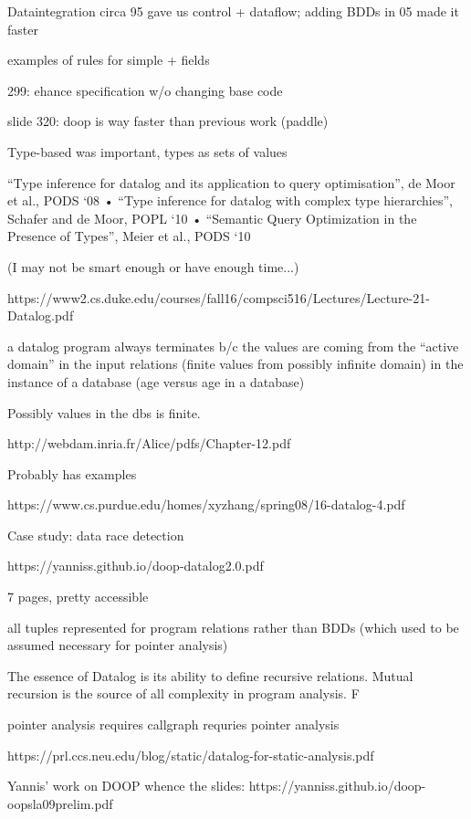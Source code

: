 \documentclass[11pt]{article}
\begin{document}
Dataintegration circa 95 gave us control + dataflow; adding BDDs in 05 made it
faster

examples of rules for simple + fields

299: ehance specification w/o changing base code

slide 320: doop is way faster than previous work (paddle)

Type-based was important, types as sets of values

“Type inference for datalog and its application to
query optimisation”, de Moor et al., PODS ‘08
• “Type inference for datalog with complex type
hierarchies”, Schafer and de Moor, POPL ‘10
• “Semantic Query Optimization in the Presence of
Types”, Meier et al., PODS ‘10

(I may not be smart enough or have enough time...)


https://www2.cs.duke.edu/courses/fall16/compsci516/Lectures/Lecture-21-Datalog.pdf

a datalog program always terminates b/c the values are coming from the ``active
domain'' in the input relations (finite values from possibly infinite domain) in
the instance of a database (age versus age in a database)

Possibly values in the dbs is finite. 


http://webdam.inria.fr/Alice/pdfs/Chapter-12.pdf

Probably has examples


https://www.cs.purdue.edu/homes/xyzhang/spring08/16-datalog-4.pdf

Case study: data race detection

https://yanniss.github.io/doop-datalog2.0.pdf

7 pages, pretty accessible

all tuples represented for program relations rather than BDDs (which used to be
assumed necessary for pointer analysis)


The essence of Datalog is its ability to define recursive relations. Mutual
recursion is the source of all complexity in program analysis. F

pointer analysis requires callgraph requries pointer analysis


https://prl.ccs.neu.edu/blog/static/datalog-for-static-analysis.pdf







Yannis' work on DOOP whence the slides:
https://yanniss.github.io/doop-oopsla09prelim.pdf
\end{document}
